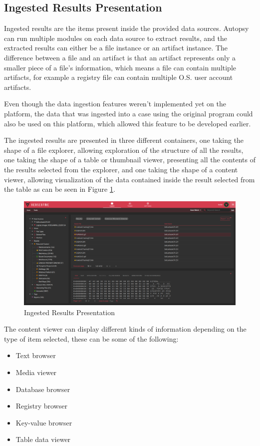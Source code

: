 \subsection{Ingested Results Presentation}

Ingested results are the items present inside the provided data sources. Autopsy can run multiple modules on each data source to extract results, and the extracted results can either be a file instance or an artifact instance.
The difference between a file and an artifact is that an artifact represents only a smaller piece of a file's information, which means a file can contain multiple artifacts, for example a registry file can contain multiple O.S. user account artifacts.

Even though the data ingestion features weren't implemented yet on the platform, the data that was ingested into a case using the original program could also be used on this platform, which allowed this feature to be developed earlier.

The ingested results are presented in three different containers, one taking the shape of a file explorer, allowing exploration of the structure of all the results, 
one taking the shape of a table or thumbnail viewer, presenting all the contents of the results selected from the explorer, and one taking the shape of a content viewer, allowing visualization
of the data contained inside the result selected from the table as can be seen in Figure \ref{fig:data}.

\begin{figure}[ht]
 \centering
 \includegraphics[width=1\linewidth]{imgs/data.png}
 \caption{Ingested Results Presentation}
 \label{fig:data}
\end{figure}

The content viewer can display different kinds of information depending on the type of item selected, these can be some of the following:
\begin{itemize}
 \item Text browser
 \item Media viewer
 \item Database browser
 \item Registry browser
 \item Key-value browser
 \item Table data viewer
\end{itemize}

